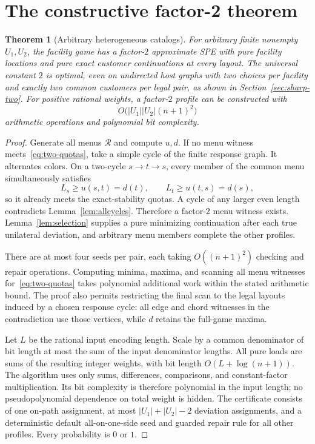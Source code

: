 \documentclass[11pt]{article}
\newtheorem{theorem}{Theorem}[section]
\theoremstyle{definition}
\theoremstyle{remark}
\newcommand{\Rmenu}{\mathcal R}
\newcommand{\Uone}{U_1}
\newcommand{\Utwo}{U_2}
\begin{document}
\section{The constructive factor-2 theorem}\label{sec:two}

\begin{theorem}[Arbitrary heterogeneous catalogs]\label{thm:two}
For arbitrary finite nonempty $\Uone,\Utwo$, the facility game has a factor-$2$ approximate SPE with pure facility locations and pure exact customer continuations at every layout. The universal constant $2$ is optimal, even on undirected host graphs with two choices per facility and exactly two common customers per legal pair, as shown in Section~\ref{sec:sharp-two}. For positive rational weights, a factor-$2$ profile can be constructed with
\[
 O\bigl(|\Uone||\Utwo|(n+1)^2\bigr)
\]
arithmetic operations and polynomial bit complexity.
\end{theorem}
\begin{proof}
Generate all menus $\Rmenu$ and compute $u,d$. If no menu witness meets~\eqref{eq:two-quotas}, take a simple cycle of the finite response graph. It alternates colors. On a two-cycle $s\to t\to s$, every member of the common menu simultaneously satisfies
\[
 L_s\ge u(s,t)=d(t),\qquad L_t\ge u(t,s)=d(s),
\]
so it already meets the exact-stability quotas. A cycle of any larger even length contradicts Lemma~\ref{lem:allcycles}. Therefore a factor-$2$ menu witness exists. Lemma~\ref{lem:selection} supplies a pure minimizing continuation after each true unilateral deviation, and arbitrary menu members complete the other profiles.

There are at most four seeds per pair, each taking $O((n+1)^2)$ checking and repair operations. Computing minima, maxima, and scanning all menu witnesses for~\eqref{eq:two-quotas} takes polynomial additional work within the stated arithmetic bound. The proof also permits restricting the final scan to the legal layouts induced by a chosen response cycle: all edge and chord witnesses in the contradiction use those vertices, while $d$ retains the full-game maxima.

Let $L$ be the rational input encoding length. Scale by a common denominator of bit length at most the sum of the input denominator lengths. All pure loads are sums of the resulting integer weights, with bit length $O(L+\log(n+1))$. The algorithm uses only sums, differences, comparisons, and constant-factor multiplication. Its bit complexity is therefore polynomial in the input length; no pseudopolynomial dependence on total weight is hidden. The certificate consists of one on-path assignment, at most $|\Uone|+|\Utwo|-2$ deviation assignments, and a deterministic default all-on-one-side seed and guarded repair rule for all other profiles. Every probability is $0$ or $1$.
\end{proof}
\end{document}
